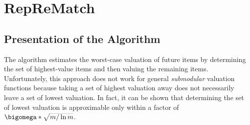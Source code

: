 \section{RepReMatch}
\label{sec:reprematch}

\subsection{Presentation of the Algorithm}
\label{subsec:reprematch:presentation}

The algorithm \SMatch{} estimates the worst-case valuation of future items by determining the set of highest-value items and then valuing the remaining items.
Unfortunately, this approach does not work for general \emph{submodular} valuation functions because taking a set of highest valuation away does not necessarily leave a set of lowest valuation.
In fact, it can be shown \cite{submodular_low_value} that determining the set of lowest valuation is approximable only within a factor of \(\smash[t]{\bigomega*{ \sqrt{m / \ln m} }}\).

